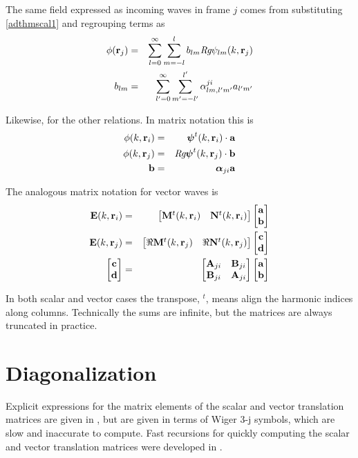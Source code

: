 The same field expressed as incoming waves in frame $j$ comes from substituting \eqref{adthmscal1} and regrouping terms as
\begin{eqnarray}
\phi(\mathbf{r}_j) &=& \sum_{l=0}^{\infty}\sum_{m=-l}^{l} b_{lm}  \textit{Rg}\psi_{lm}(k,\mathbf{r}_j) \\
b_{lm} &=& \sum_{l'=0}^{\infty}\sum_{m'=-l'}^{l'} \alpha^{ji}_{lm,l'm'}a_{l'm'}
\end{eqnarray}
%

Likewise, for the other relations. In matrix notation this is 
\begin{eqnarray}
\phi(k,\mathbf{r}_i) &=&  \boldsymbol{\psi}^t(k,\mathbf{r}_i)\cdot \mathbf{a} \\
\phi(k,\mathbf{r}_j) &=&  \textit{Rg}\boldsymbol{\psi}^t(k,\mathbf{r}_j)\cdot \mathbf{b} \\
\mathbf{b} &=& \boldsymbol{\alpha}_{ji} \mathbf{a}
\end{eqnarray}

The analogous matrix notation for vector waves is
\begin{eqnarray}
\mathbf{E}(k,\mathbf{r}_i) &=& \begin{bmatrix} {\mathbf{M}^t(k,\mathbf{r}_i)} & {\mathbf{N}^t(k,\mathbf{r}_i)} \end{bmatrix}\begin{bmatrix} {\mathbf{a}} \\ {\mathbf{b}} \end{bmatrix} \\
\mathbf{E}(k,\mathbf{r}_j)&=& \begin{bmatrix} {\Re\mathbf{M}^t(k,\mathbf{r}_j)} & {\Re\mathbf{N}^t(k,\mathbf{r}_j)} \end{bmatrix}\begin{bmatrix} {\mathbf{c}} \\ {\mathbf{d}} \end{bmatrix} \\
\begin{bmatrix} {\mathbf{c}} \\ {\mathbf{d}} \end{bmatrix}  &=&\begin{bmatrix} {\mathbf{A}_{ji}} & {\mathbf{B}_{ji}} \\ {\mathbf{B}_{ji}} & {\mathbf{A}_{ji}} \end{bmatrix}\begin{bmatrix} {\mathbf{a}} \\ {\mathbf{b}} \end{bmatrix}
\end{eqnarray}

In both scalar and vector cases the transpose, $^t$, means align the harmonic indices along columns. Technically the sums are infinite, but the matrices are always truncated in practice.

\section{Diagonalization}

Explicit expressions for the matrix elements of the scalar and vector translation matrices are given in \cite{chew1995waves}, but are given in terms of Wiger 3-j symbols, which are slow and inaccurate to compute. Fast recursions for quickly computing the scalar and vector translation matrices were developed in \cite{mackowski1991analysis, chew1992recurrence, chew1993efficient}.  

